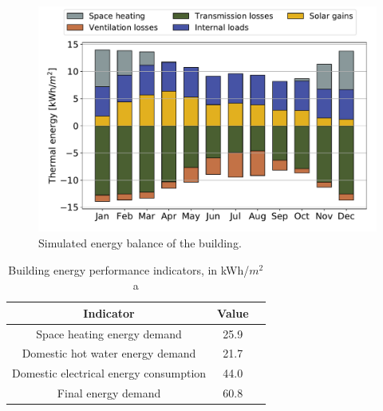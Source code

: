 \documentclass[twocolumn, a4paper,10pt]{article}
\begin{document}
\begin{figure}[H]
\centering
\includegraphics[scale=0.34]{img/HDU_Enbal.pdf}
\caption{Simulated energy balance of the building.}
\label{fig:HDU_Enbal}
\vspace{-5pt}  %
\end{figure}

\begin{table}[H]
\vspace{-5pt}  %
\caption{Building energy performance indicators, in kWh/$m^2$a}
\label{tab:indicators}
\centering
\begin{tabular}{| c | c | c | }
  \hline
  \bf{Indicator} & \bf{Value} \\
  \hline
  Space heating energy demand & 25.9 \\
  Domestic hot water energy demand & 21.7 \\
  Domestic electrical energy consumption & 44.0 \\
  Final energy demand & 60.8 \\
  \hline
\end{tabular}
\vspace{-5pt}   %
\end{table}

\end{document}
